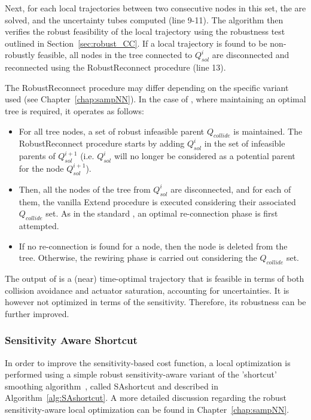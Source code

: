 Next, for each local trajectories between two consecutive nodes in this set, the  are solved, and the uncertainty tubes computed (line 9-11).
The algorithm then verifies the robust feasibility of the local trajectory using the robustness test outlined in Section~\ref{sec:robust_CC}. 
If a local trajectory is found to be non-robustly feasible, all nodes in the tree connected to $Q_{sol}^i$ are disconnected and reconnected using the RobustReconnect procedure (line 13).

The RobustReconnect procedure may differ depending on the specific  variant used (see Chapter~\ref{chap:sampNN}). 
In the case of , where maintaining an optimal tree is required, it operates as follows:
\begin{itemize}
    \item For all tree nodes, a set of robust infeasible parent $Q_{collide}$ is maintained. 
    The RobustReconnect procedure starts by adding $Q_{sol}^i$ in the set of infeasible parents of $Q_{sol}^{i+1}$ (i.e. $Q_{sol}^i$ will no longer be considered as a potential parent for the node $Q_{sol}^{i+1}$).
    \item Then, all the nodes of the tree from $Q_{sol}^i$ are disconnected, and for each of them, the vanilla Extend procedure is executed considering their associated $Q_{collide}$ set.
    As in the standard , an optimal re-connection phase is first attempted.
    \item If no re-connection is found for a node, then the node is deleted from the tree. 
    Otherwise, the rewiring phase is carried out considering the $Q_{collide}$ set.
\end{itemize}

The output of  is a (near) time-optimal trajectory that is feasible in terms of both collision avoidance and actuator saturation, accounting for uncertainties.
It is however not optimized in terms of the sensitivity. 
Therefore, its robustness can be further improved.

\subsubsection{Sensitivity Aware Shortcut}

In order to improve the sensitivity-based cost function, a local optimization is performed using a simple robust sensitivity-aware variant of the 'shortcut' smoothing algorithm~\cite{cShortcut}, called \gls{SAshortcut} and described in Algorithm~\ref{alg:SAshortcut}. 
A more detailed discussion regarding the robust sensitivity-aware local optimization can be found in Chapter~\ref{chap:sampNN}.

